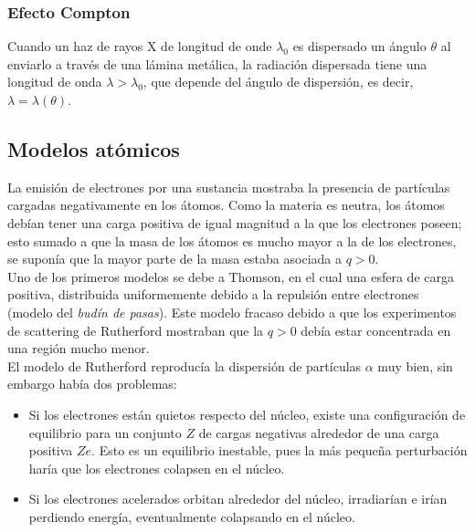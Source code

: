 \documentclass[a4paper]{article}
\begin{document}
\subsubsection{Efecto Compton}

Cuando un haz de rayos X de longitud de onde $\lambda_{0}$ es dispersado un \'angulo $\theta$ al enviarlo a trav\'es de una l\'amina met\'alica, la radiaci\'on dispersada tiene una longitud de onda $\lambda > \lambda_{0}$, que depende del \'angulo de dispersi\'on, es decir, $\lambda = \lambda(\theta)$.

\subsection{Modelos at\'omicos}

La emisi\'on de electrones por una sustancia mostraba la presencia de part\'iculas cargadas negativamente en los \'atomos. Como la materia es neutra, los \'atomos deb\'ian tener una carga positiva de igual magnitud a la que los electrones poseen; esto sumado a que la masa de los \'atomos es mucho mayor a la de los electrones, se supon\'ia que la mayor parte de la masa estaba asociada a $q > 0$.\\

Uno de los primeros modelos se debe a Thomson, en el cual una esfera de carga positiva, distribuida uniformemente debido a la repulsi\'on entre electrones (modelo del \textit{bud\'in de pasas}). Este modelo fracaso debido a que los experimentos de scattering de Rutherford mostraban que la $q > 0$ deb\'ia estar concentrada en una regi\'on mucho menor.\\

El modelo de Rutherford reproduc\'ia la dispersi\'on de part\'iculas $\alpha$ muy bien, sin embargo hab\'ia dos problemas:\\

\begin{itemize}
\item Si los electrones est\'an quietos respecto del n\'ucleo, existe una configuraci\'on de equilibrio para un conjunto $Z$ de cargas negativas alrededor de una carga positiva $Ze$. Esto es un equilibrio inestable, pues la m\'as peque\~na perturbaci\'on har\'ia que los electrones colapsen en el n\'ucleo.
\item Si los electrones acelerados orbitan alrededor del n\'ucleo, irradiar\'ian e ir\'ian perdiendo energ\'ia, eventualmente colapsando en el n\'ucleo.
\end{itemize}
\end{document}
